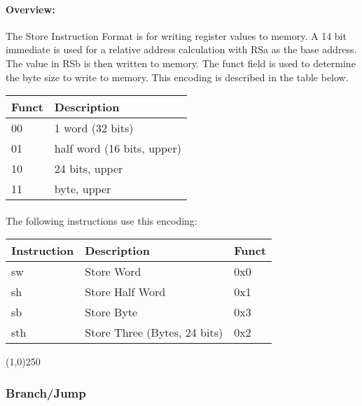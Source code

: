 \documentclass[letterpaper, 11pt]{article}
\begin{document}
\paragraph{Overview:}The Store Instruction Format is for writing register values to memory. A 14 bit immediate is used
for a relative address calculation with RSa as the base address. The value in RSb is then written to memory. The funct field is used
to determine the byte size to write to memory. This encoding is described in the table below. \\
\begin{tabular}{l|l}
		Funct & Description \\ \hline
		00	  & 1 word (32 bits) \\
		01	  & half word (16 bits, upper) \\ 
		10	  & 24 bits, upper \\
		11	  & byte, upper		\\
		\end{tabular}
\paragraph{}The following instructions use this encoding: \\
\begin{center}
	\begin{tabular}{|l|l|l|} \hline
			Instruction & Description 						& Funct\\ \hline
			sw			& Store Word							& 0x0 \\ \hline
			sh			& Store Half Word					& 0x1 \\ \hline
			sb			& Store Byte							& 0x3 \\ \hline
			sth			& Store Three (Bytes, 24 bits)		& 0x2 \\ \hline

\end{tabular}
\end{center}
\begin{center}
	\line(1,0){250}
\end{center}

\newpage
\subsubsection{Branch/Jump}
\end{document}
